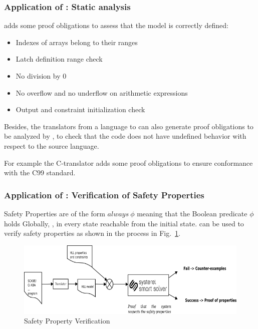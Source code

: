 \subsubsection{Application of \smartsolver{}: Static analysis}
\label{sec:static-analysis}

\smartsolver{} adds some proof obligations to assess that the \HLL{}
model is correctly defined:
\begin{itemize}
\item Indexes of arrays belong to their ranges
\item Latch definition range check
\item No division by 0
\item No overflow and no underflow on arithmetic expressions
\item Output and constraint initialization check
\end{itemize}

Besides, the translators from a language to \HLL{} can also generate proof obligations to be analyzed by \smartsolver{},
to check that the code does not have undefined behavior with respect to the source language.

For example the C-translator adds some proof obligations to ensure conformance with the C99 standard.

\subsubsection{Application of \smartsolver{}: Verification of Safety Properties}
\label{sec:verif-safety-prop}

Safety Properties are of the form $always~\phi$ meaning that the Boolean
predicate $\phi$ holds Globally, \ie{}, in every state reachable from the
initial state. \smartsolver{} can be used to verify safety properties as shown
in the process in Fig.~\ref{fig:s3-safety-prop}.


\begin{figure}[h]
  \centering
  \includegraphics[width=1\textwidth]{figures/s3proof}
  \caption{Safety Property Verification}
  \label{fig:s3-safety-prop}
\end{figure}


